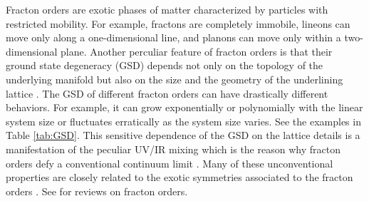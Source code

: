 \documentclass[aps,prb,twocolumn,superscriptaddress,floatfix,10pt,nofootinbib]{revtex4-2}
\theoremstyle{definition}
\begin{document}
Fracton orders \cite{Chamon:2004lew,Haah:2011drr,Vijay:2015mka,Vijay:2016phm} are exotic phases of matter characterized by particles with restricted mobility.  For example, fractons are completely immobile, lineons can move only along a one-dimensional line, and planons can move only within a two-dimensional plane. Another perculiar feature of fracton orders is that their ground state degeneracy (GSD)  depends not only on the topology of the underlying manifold but also on the size and the geometry of the underlining lattice \cite{Shirley:2017suz}.  
The GSD of different fracton orders can have drastically different behaviors. For example, it can grow exponentially or polynomially with the linear system size or fluctuates erratically as the system size varies. See the examples in Table \ref{tab:GSD}.
This sensitive dependence of the GSD on the lattice details is a manifestation of the peculiar UV/IR mixing which is the reason why fracton orders defy a conventional continuum limit \cite{Seiberg:2020bhn,Gorantla:2021bda}. Many of these unconventional properties are closely related to the exotic symmetries associated to the fracton orders \cite{Seiberg:2019vrp,Seiberg:2020bhn,Seiberg:2020wsg,Seiberg:2020cxy,Gorantla:2022eem}. See \cite{Nandkishore:2018sel,Pretko:2020cko} for reviews on fracton orders.
\end{document}

